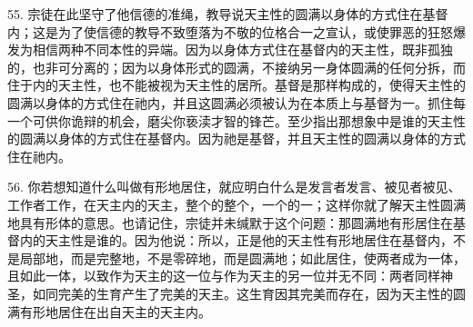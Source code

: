 55. 宗徒在此坚守了他信德的准绳，教导说天主性的圆满以身体的方式住在基督内；这是为了使信德的教导不致堕落为不敬的位格合一之宣认，或使罪恶的狂怒爆发为相信两种不同本性的异端。因为以身体方式住在基督内的天主性，既非孤独的，也非可分离的；因为以身体形式的圆满，不接纳另一身体圆满的任何分拆，而住于内的天主性，也不能被视为天主性的居所。基督是那样构成的，使得天主性的圆满以身体的方式住在祂内，并且这圆满必须被认为在本质上与基督为一。抓住每一个可供你诡辩的机会，磨尖你亵渎才智的锋芒。至少指出那想象中是谁的天主性的圆满以身体的方式住在基督内。因为祂是基督，并且天主性的圆满以身体的方式住在祂内。\par

56. 你若想知道什么叫做有形地居住，就应明白什么是发言者发言、被见者被见、工作者工作，在天主内的天主，整个的整个，一个的一；这样你就了解天主性圆满地具有形体的意思。也请记住，宗徒并未缄默于这个问题：那圆满地有形居住在基督内的天主性是谁的。因为他说：所以，正是他的天主性有形地居住在基督内，不是局部地，而是完整地，不是零碎地，而是圆满地；如此居住，使两者成为一体，且如此一体，以致作为天主的这一位与作为天主的另一位并无不同：两者同样神圣，如同完美的生育产生了完美的天主。这生育因其完美而存在，因为天主性的圆满有形地居住在出自天主的天主内。\par



\section{}

